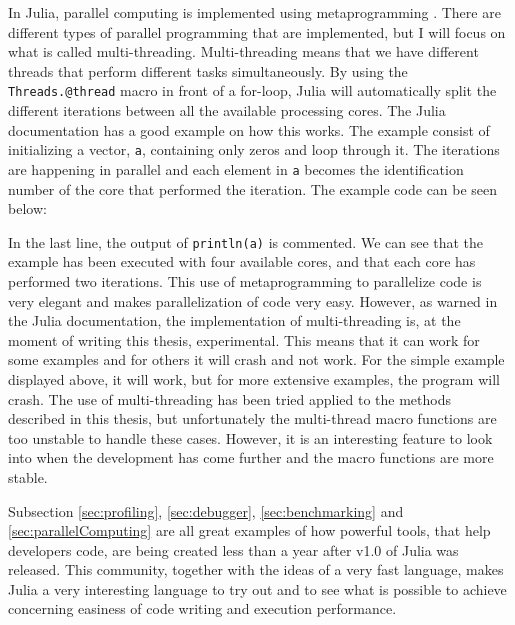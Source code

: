 In Julia, parallel computing is implemented using metaprogramming \emph{\citep{ParallellComputing}}. There are different types of parallel programming that are implemented, but I will focus on what is called multi-threading. Multi-threading means that we have different threads that perform different tasks simultaneously. By using the \texttt{Threads.@thread} macro in front of a for-loop, Julia will automatically split the different iterations between all the available processing cores. The Julia documentation has a good example on how this works. The example consist of initializing a vector, \texttt{a}, containing only zeros and loop through it. The iterations are happening in parallel and each element in \texttt{a} becomes the identification number of the core that performed the iteration. The example code can be seen below:

In the last line, the output of \texttt{println(a)} is commented. We can see that the example has been executed with four available cores, and that each core has performed two iterations. This use of metaprogramming to parallelize code is very elegant and makes parallelization of code very easy. However, as warned in the Julia documentation, the implementation of multi-threading is, at the moment of writing this thesis, experimental. This means that it can work for some examples and for others it will crash and not work. For the simple example displayed above, it will work, but for more extensive examples, the program will crash. The use of multi-threading has been tried applied to the methods described in this thesis, but unfortunately the multi-thread macro functions are too unstable to handle these cases. However, it is an interesting feature to look into when the development has come further and the macro functions are more stable. 

Subsection \ref{sec:profiling}, \ref{sec:debugger}, \ref{sec:benchmarking} and \ref{sec:parallelComputing} are all great examples of how powerful tools, that help developers code, are being created less than a year after v1.0 of Julia was released. This community, together with the ideas of a very fast language, makes Julia a very interesting language to try out and to see what is possible to achieve concerning easiness of code writing and execution performance.